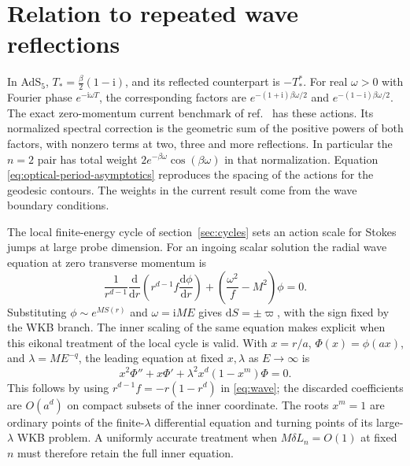 \documentclass[11pt,a4paper]{article}
\newcommand{\dd}{\mathrm{d}}
\newcommand{\ii}{\mathrm{i}}
\begin{document}



\section{Relation to repeated wave reflections}

In AdS\(_5\), \(T_*=\frac{\beta}{2}(1-\ii)\), and its reflected counterpart is \(-T_*^*\). For real \(\omega>0\) with Fourier phase \(e^{-\ii\omega T}\), the corresponding factors are \(e^{-(1+\ii)\beta\omega/2}\) and \(e^{-(1-\ii)\beta\omega/2}\). The exact zero-momentum current benchmark of ref.~\cite{AfkhamiJeddi:2025} has these actions. Its normalized spectral correction is the geometric sum of the positive powers of both factors, with nonzero terms at two, three and more reflections. In particular the \(n=2\) pair has total weight \(2 e^{-\beta\omega}\cos(\beta\omega)\) in that normalization. Equation \eqref{eq:optical-period-asymptotics} reproduces the spacing of the actions for the geodesic contours. The weights in the current result come from the wave boundary conditions.

The local finite-energy cycle of section~\ref{sec:cycles} sets an action scale for Stokes jumps at large probe dimension. For an ingoing scalar solution the radial wave equation at zero transverse momentum is
\begin{equation}
 \frac{1}{r^{d-1}}\frac{\dd}{\dd r}
 \left(r^{d-1} f\frac{\dd\phi}{\dd r}\right)
 +\left(\frac{\omega^2}{f}-M^2\right)\phi=0 .
 \label{eq:wave}
\end{equation}
Substituting \(\phi\sim e^{M S(r)}\) and \(\omega=\ii M E\) gives \(\dd S=\pm\varpi\), with the sign fixed by the WKB branch. The inner scaling of the same equation makes explicit when this eikonal treatment of the local cycle is valid. With \(x=r/a\), \(\Phi(x)=\phi(ax)\), and \(\lambda=M E^{-q}\), the leading equation at fixed \(x,\lambda\) as \(E\to\infty\) is
\begin{equation}
 x^2\Phi''+x\Phi'+\lambda^2 x^d(1-x^m)\Phi=0 .
 \label{eq:inner-wave}
\end{equation}
This follows by using \(r^{d-1}f=-r(1-r^d)\) in \eqref{eq:wave}; the discarded coefficients are \(O(a^d)\) on compact subsets of the inner coordinate. The roots \(x^m=1\) are ordinary points of the finite-\(\lambda\) differential equation and turning points of its large-\(\lambda\) WKB problem. A uniformly accurate treatment when \(M\delta L_n=O(1)\) at fixed \(n\) must therefore retain the full inner equation.
\end{document}
